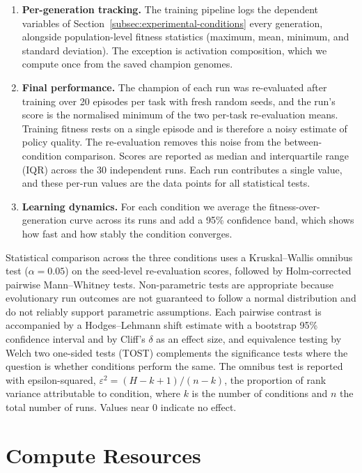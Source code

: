 \begin{enumerate}
    \item \textbf{Per-generation tracking.} The training pipeline logs the dependent variables of Section~\ref{subsec:experimental-conditions} every generation, alongside population-level fitness statistics (maximum, mean, minimum, and standard deviation). The exception is activation composition, which we compute once from the saved champion genomes.
    \item \textbf{Final performance.} The champion of each run was re-evaluated after training over 20 episodes per task with fresh random seeds, and the run's score is the normalised minimum of the two per-task re-evaluation means. Training fitness rests on a single episode and is therefore a noisy estimate of policy quality. The re-evaluation removes this noise from the between-condition comparison. Scores are reported as median and interquartile range (IQR) across the 30 independent runs. Each run contributes a single value, and these per-run values are the data points for all statistical tests.
    \item \textbf{Learning dynamics.} For each condition we average the fitness-over-generation curve across its runs and add a 95\% confidence band, which shows how fast and how stably the condition converges.
\end{enumerate}

Statistical comparison across the three conditions uses a Kruskal--Wallis omnibus test ($\alpha = 0.05$) on the seed-level re-evaluation scores, followed by Holm-corrected pairwise Mann--Whitney tests.
Non-parametric tests are appropriate because evolutionary run outcomes are not guaranteed to follow a normal distribution and do not reliably support parametric assumptions.
Each pairwise contrast is accompanied by a Hodges--Lehmann shift estimate with a bootstrap 95\% confidence interval and by Cliff's $\delta$ as an effect size, and equivalence testing by Welch two one-sided tests (TOST) complements the significance tests where the question is whether conditions perform the same.
The omnibus test is reported with epsilon-squared, $\varepsilon^2 = (H - k + 1)/(n - k)$, the proportion of rank variance attributable to condition, where $k$ is the number of conditions and $n$ the total number of runs. Values near $0$ indicate no effect.

\section{Compute Resources}
\label{subsec:compute-resources}

